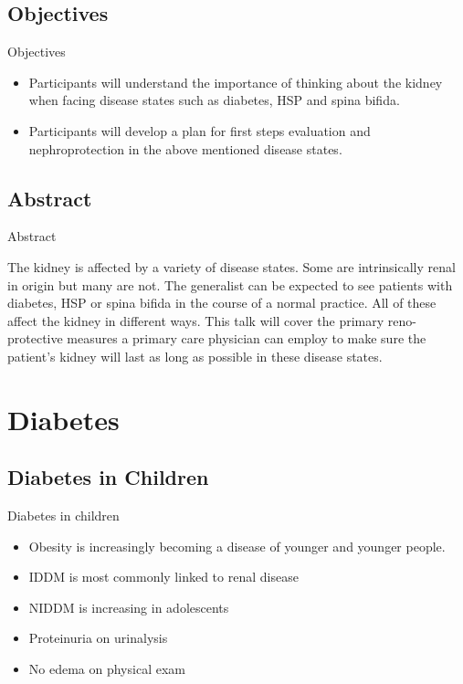 \subsection{Objectives}\label{objectives}

\begin{frame}{Objectives}

\begin{itemize}
\itemsep1pt\parskip0pt
\item
  Participants will understand the importance of thinking about the
  kidney when facing disease states such as diabetes, HSP and spina
  bifida.
\item
  Participants will develop a plan for first steps evaluation and
  nephroprotection in the above mentioned disease states.
\end{itemize}

\end{frame}

\subsection{Abstract}\label{abstract}

\begin{frame}{Abstract}

The kidney is affected by a variety of disease states. Some are
intrinsically renal in origin but many are not. The generalist can be
expected to see patients with diabetes, HSP or spina bifida in the
course of a normal practice. All of these affect the kidney in different
ways. This talk will cover the primary reno-protective measures a
primary care physician can employ to make sure the patient's kidney will
last as long as possible in these disease states.

\end{frame}

\section{Diabetes}\label{diabetes}

\frame{\tableofcontents[hideothersubsections]}

\subsection{Diabetes in Children}\label{diabetes-in-children}

\begin{frame}{Diabetes in children}

\begin{itemize}
\itemsep1pt\parskip0pt
\item
  Obesity is increasingly becoming a disease of younger and younger
  people.
\item
  IDDM is most commonly linked to renal disease
\item
  NIDDM is increasing in adolescents
\item
  Proteinuria on urinalysis
\item
  No edema on physical exam
\end{itemize}

\end{frame}

